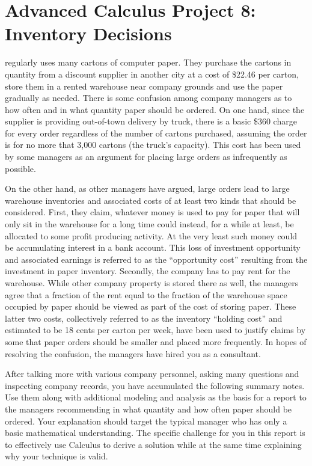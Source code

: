 \documentclass
[justified,nohyper]
{tufte-handout}
\begin{document}
\section{Advanced Calculus Project 8: Inventory Decisions}

 regularly uses many cartons of computer paper. They purchase the cartons in quantity from a discount supplier in another city at a cost of \$22.46 per carton, store them in a rented warehouse near company grounds and use the paper gradually as needed. There is some confusion among company managers as to how often and in what quantity paper should be ordered. On one hand, since the supplier is providing out-of-town delivery by truck, there is a basic \$360 charge for every order regardless of the number of cartons purchased, assuming the order is for no more that 3,000 cartons (the truck's capacity). This cost has been used by some managers as an argument for placing large orders as infrequently as possible.

On the other hand, as other managers have argued, large orders lead to large warehouse inventories and associated costs of at least two kinds that should be considered. First, they claim, whatever money is used to pay for paper that will only sit in the warehouse for a long time could instead, for a while at least, be allocated to some profit producing activity. At the very least such money could be accumulating interest in a bank account. This loss of investment opportunity and associated earnings is referred to as the ``opportunity cost'' resulting from the investment in paper inventory. Secondly, the company has to pay rent for the warehouse. While other company property is stored there as well, the managers agree that a fraction of the rent equal to the fraction of the warehouse space occupied by paper should be viewed as part of the cost of storing paper. These latter two costs, collectively referred to as the inventory ``holding cost'' and estimated to be 18 cents per carton per week, have been used to justify claims by some that paper orders should be smaller and placed more frequently. In hopes of resolving the confusion, the managers have hired you as a consultant.

After talking more with various company personnel, asking many questions and inspecting company records, you have accumulated the following summary notes. Use them along with additional modeling and analysis as the basis for a report to the managers recommending in what quantity and how often paper should be ordered. Your explanation should target the typical manager who has only a basic mathematical understanding. The specific challenge for you in this report is to effectively use Calculus to derive a solution while at the same time explaining why your technique is valid.
\end{document}
